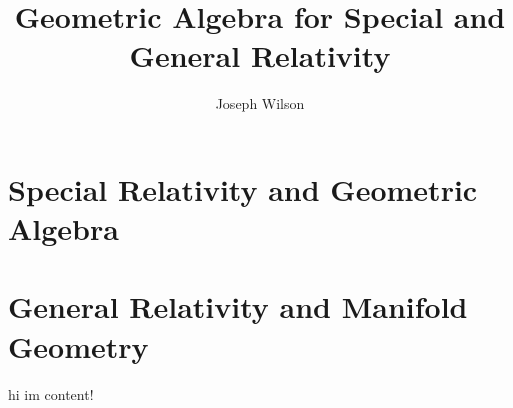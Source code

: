 \newif\ifdebug
\newif\iffinal





\title{Geometric Algebra for Special and General Relativity}
\author{Joseph Wilson}





	\maketitle
	\tableofcontents

\restoregeometry %

\ifdebug
	
\fi





\part{Special Relativity and Geometric Algebra}
\label{part:1}









\part{General Relativity and Manifold Geometry}
\label{part:2}

hi im content!







